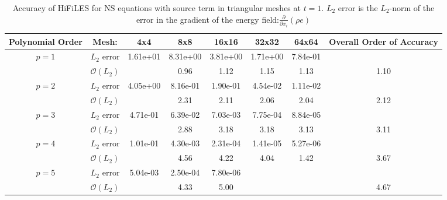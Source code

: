 \begin{table}[H]
\centering
\begin{tabular}{ c c c c c c c c} 
  
 Polynomial Order & Mesh: & 4x4 & 8x8 & 16x16 & 32x32 & 64x64 & Overall Order of Accuracy \\ 
 \hline 
 \multirow{2}{*}{$p = 1$} & $L_2$ error & 1.61e+01 & 8.31e+00 & 3.81e+00 & 1.71e+00 & 7.84e-01 &   \\ 
  
   & $\mathcal{O}(L_2)$ &   & 0.96 & 1.12 & 1.15 & 1.13 & 1.10 \\ 
 \hline 
 \multirow{2}{*}{$p = 2$} & $L_2$ error & 4.05e+00 & 8.16e-01 & 1.90e-01 & 4.54e-02 & 1.11e-02 &   \\ 
  
   & $\mathcal{O}(L_2)$ &   & 2.31 & 2.11 & 2.06 & 2.04 & 2.12 \\ 
 \hline 
 \multirow{2}{*}{$p = 3$} & $L_2$ error & 4.71e-01 & 6.39e-02 & 7.03e-03 & 7.75e-04 & 8.84e-05 &   \\ 
  
   & $\mathcal{O}(L_2)$ &   & 2.88 & 3.18 & 3.18 & 3.13 & 3.11 \\ 
 \hline 
 \multirow{2}{*}{$p = 4$} & $L_2$ error & 1.01e-01 & 4.30e-03 & 2.31e-04 & 1.41e-05 & 5.27e-06 &   \\ 
  
   & $\mathcal{O}(L_2)$ &   & 4.56 & 4.22 & 4.04 & 1.42 & 3.67 \\ 
 \hline 
 \multirow{2}{*}{$p = 5$} & $L_2$ error & 5.04e-03 & 2.50e-04 & 7.80e-06 &   &   &   \\ 
  
   & $\mathcal{O}(L_2)$ &   & 4.33 & 5.00 &   &   & 4.67 \\ 
 \hline 
 \end{tabular}
\caption{Accuracy of HiFiLES for NS equations with source term in triangular meshes at $t = 1$. $L_2$ error is the $L_2$-norm of the error in the gradient of the energy field:$\frac{\partial}{\partial x_i} (\rho e)$}
\label{table:trisError2} 
 \end{table}
